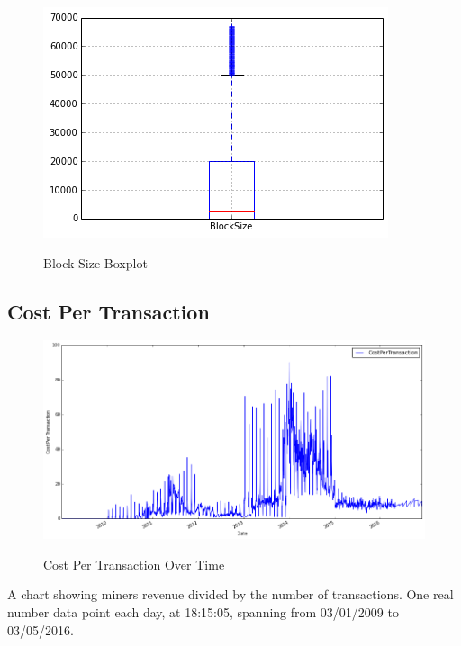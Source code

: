 \begin{figure}[bth]
  \myfloatalign
  {\includegraphics[width=1\linewidth]
    {gfx/block-size-boxplot}}
  \caption{Block Size Boxplot}
  \label{fig:block-size-boxplot}
\end{figure}

\clearpage

\subsection{Cost Per Transaction}
\label{sec:cost-per-transaction}

\begin{figure}[bth]
  \myfloatalign
  {\includegraphics[width=1\linewidth]
    {gfx/cost-per-transaction-over-time}}
  \caption{Cost Per Transaction Over Time}
  \label{fig:cost-per-transaction-over-time}
\end{figure}

A chart showing miners revenue divided by the number of transactions.
One real number data point each day, at 18:15:05, spanning from
03/01/2009 to 03/05/2016.


